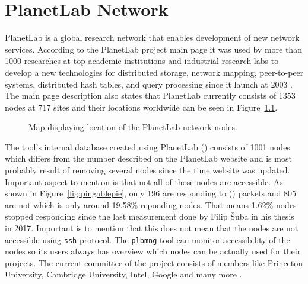 \chapter{PlanetLab Network}
\label{chapter:planetlabnetwork}
PlanetLab is a global research network that enables development of new network services. According to the PlanetLab project main page it was used by more than 1000 researches at top academic institutions and industrial research labs to develop a new technologies for distributed storage, network mapping, peer-to-peer systems, distributed hash tables, and query processing since it launch at 2003 \cite{planetlabmain}. The main page description also states that PlanetLab currently consists of 1353 nodes at 717 sites and their locations worldwide can be seen in Figure~\ref{fig:location}.

\begin{figure}[H]
	\centering
	\caption{Map displaying location of the PlanetLab network nodes.}
	\label{fig:location}
\end{figure}

The tool's internal database created using PlanetLab  () consists of 1001 nodes which differs from the number described on the PlanetLab website and is most probably result of removing several nodes since the time website was updated. Important aspect to mention is that not all of those nodes are accessible. As shown in Figure~\ref{fig:pingablepie}, only 196 are responding to  () packets and 805 are not which is only around 19.58\% reponding nodes. That means 1.62\% nodes stopped responding since the last measurement done by Filip Šuba in his thesis \cite{suba1} in 2017. Important is to mention that this does not mean that the nodes are not accessible using \texttt{ssh} protocol. The \texttt{plbmng} tool can monitor accessibility of the nodes so its users always has overview which nodes can be actually used for their projects. The current committee of the project consists of members like Princeton University, Cambridge University, Intel, Google and many more \cite{planetlabmain}.\\

